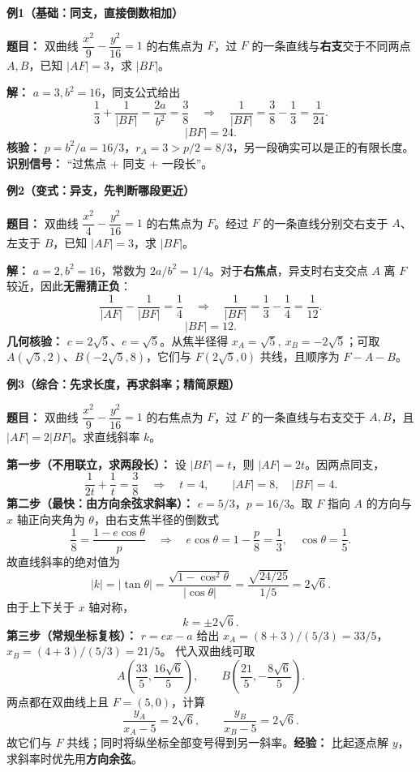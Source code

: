 \begin{examplebox}
  \textbf{\textcolor{CExample}{例1（基础：同支，直接倒数相加）}}

  \textbf{题目：} 双曲线 $\dfrac{x^2}{9}-\dfrac{y^2}{16}=1$ 的右焦点为 $F$，过 $F$ 的一条直线与\textbf{右支}交于不同两点 $A,B$，已知 $|AF|=3$，求 $|BF|$。

  \textbf{解：} $a=3,b^2=16$，同支公式给出
  \[
    \frac13+\frac1{|BF|}=\frac{2a}{b^2}=\frac38
    \quad\Longrightarrow\quad
    \frac1{|BF|}=\frac38-\frac13=\frac1{24}.
  \]
  \[
    \boxed{|BF|=24}.
  \]
  \textbf{核验：} $p=b^2/a=16/3$，$r_A=3>p/2=8/3$，另一段确实可以是正的有限长度。\textbf{识别信号：} “过焦点 + 同支 + 一段长”。

  \medskip
  \textbf{\textcolor{CExample}{例2（变式：异支，先判断哪段更近）}}

  \textbf{题目：} 双曲线 $\dfrac{x^2}{4}-\dfrac{y^2}{16}=1$ 的右焦点为 $F$。经过 $F$ 的一条直线分别交右支于 $A$、左支于 $B$，已知 $|AF|=3$，求 $|BF|$。

  \textbf{解：} $a=2,b^2=16$，常数为 $2a/b^2=1/4$。对于\textbf{右焦点}，异支时右支交点 $A$ 离 $F$ 较近，因此\textbf{无需猜正负}：
  \[
    \frac1{|AF|}-\frac1{|BF|}=\frac14
    \quad\Longrightarrow\quad
    \frac1{|BF|}=\frac13-\frac14=\frac1{12}.
  \]
  \[
    \boxed{|BF|=12}.
  \]
  \textbf{几何核验：} $c=2\sqrt5$、$e=\sqrt5$。从焦半径得
  $x_A=\sqrt5,\ x_B=-2\sqrt5$；可取
  $A(\sqrt5,2)$、$B(-2\sqrt5,8)$，它们与 $F(2\sqrt5,0)$ 共线，且顺序为 $F-A-B$。

  \medskip
  \textbf{\textcolor{CExample}{例3（综合：先求长度，再求斜率；精简原题）}}

  \textbf{题目：} 双曲线 $\dfrac{x^2}{9}-\dfrac{y^2}{16}=1$ 的右焦点为 $F$，过 $F$ 的一条直线与右支交于 $A,B$，且 $|AF|=2|BF|$。求直线斜率 $k$。

  \textbf{第一步（不用联立，求两段长）：} 设 $|BF|=t$，则 $|AF|=2t$。因两点同支，
  \[
    \frac1{2t}+\frac1t=\frac38
    \quad\Longrightarrow\quad t=4,
    \qquad\boxed{|AF|=8,\quad |BF|=4}.
  \]
  \textbf{第二步（最快：由方向余弦求斜率）：} $e=5/3$，$p=16/3$。取 $F$ 指向 $A$ 的方向与 $x$ 轴正向夹角为 $\theta$，由右支焦半径的倒数式
  \[
    \frac18=\frac{1-e\cos\theta}{p}
    \quad\Longrightarrow\quad
    e\cos\theta=1-\frac p8=\frac13,
    \quad \cos\theta=\frac15.
  \]
  故直线斜率的绝对值为
  \[
    |k|=|\tan\theta|
       =\frac{\sqrt{1-\cos^2\theta}}{|\cos\theta|}
       =\frac{\sqrt{24/25}}{1/5}=2\sqrt6.
  \]
  由于上下关于 $x$ 轴对称，
  \[
    \boxed{k=\pm2\sqrt6}.
  \]
  \textbf{第三步（常规坐标复核）：} $r=ex-a$ 给出
  $x_A=(8+3)/(5/3)=33/5$，$x_B=(4+3)/(5/3)=21/5$。
  代入双曲线可取
  \[
    A\left(\frac{33}{5},\frac{16\sqrt6}{5}\right),\qquad
    B\left(\frac{21}{5},-\frac{8\sqrt6}{5}\right).
  \]
  两点都在双曲线上且 $F=(5,0)$，计算
  \[
    \frac{y_A}{x_A-5}=2\sqrt6,
    \qquad \frac{y_B}{x_B-5}=2\sqrt6.
  \]
  故它们与 $F$ 共线；同时将纵坐标全部变号得到另一斜率。\textbf{经验：} 比起逐点解 $y$，求斜率时优先用\textbf{方向余弦}。


\end{examplebox}
